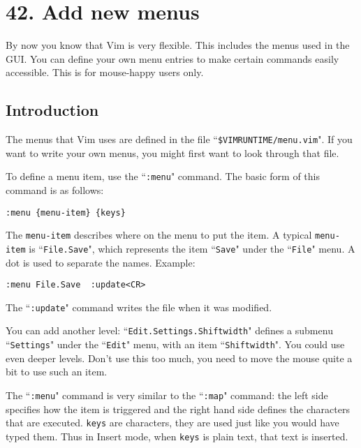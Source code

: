 \section{42. Add new menus}
By now you know that Vim is very flexible.
This includes the menus used in the GUI.
You can define your own menu entries to make certain commands easily accessible.
This is for mouse-happy users only.
\localtableofcontents
\subsection{Introduction}
The menus that Vim uses are defined in the file ``\texttt{\$VIMRUNTIME/menu.vim}".
If you want to write your own menus, you might first want to look through that file.

To define a menu item, use the ``\texttt{:menu}" command.
The basic form of this command is as follows:

\begin{Verbatim}[samepage=true]
 :menu {menu-item} {keys}
\end{Verbatim}

The \texttt{{menu-item}} describes where on the menu to put the item.
A typical \texttt{{menu-item}} is ``\texttt{File.Save}", which represents the item ``\texttt{Save}" under the ``\texttt{File}" menu.
A dot is used to separate the names.
Example:

\begin{Verbatim}[samepage=true]
 :menu File.Save  :update<CR>
\end{Verbatim}

The ``\texttt{:update}" command writes the file when it was modified.

You can add another level: ``\texttt{Edit.Settings.Shiftwidth}" defines a submenu ``\texttt{Settings}" under the ``\texttt{Edit}" menu, with an item ``\texttt{Shiftwidth}".
You could use even deeper levels.
Don't use this too much, you need to move the mouse quite a bit to use such an item.

The ``\texttt{:menu}" command is very similar to the ``\texttt{:map}" command: the left side specifies how the item is triggered and the right hand side defines the characters that are executed.
\texttt{{keys}} are characters, they are used just like you would have typed them.
Thus in Insert mode, when \texttt{{keys}} is plain text, that text is inserted.

